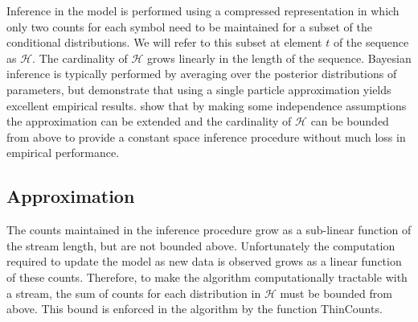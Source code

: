 Inference in the model is performed using a compressed representation in which only two counts for each symbol need to be maintained for a subset of the conditional distributions.  We will refer to this subset at element $t$ of the sequence as $\mathcal{H}$.  The cardinality of $\mathcal{H}$ grows linearly in the length of the sequence.  Bayesian inference is typically performed by averaging over the posterior distributions of parameters, but \cite{Gasthaus2010} demonstrate that using a single particle approximation yields excellent empirical results. \cite{Bartlett2010}  show that by making some independence assumptions the approximation can be extended and the cardinality of $\mathcal{H}$ can be bounded from above to provide a constant space inference procedure without much loss in  empirical performance.

\subsection{Approximation}

The counts maintained in the inference procedure grow as a sub-linear function of the stream length, but are not bounded above.  Unfortunately the computation required to update the model as new data is observed grows as a linear function of these counts.  Therefore, to make the algorithm computationally tractable with a  stream, the sum of counts for each distribution in $\mathcal{H}$ must be bounded from above.  This bound is enforced in the algorithm by the function ThinCounts.